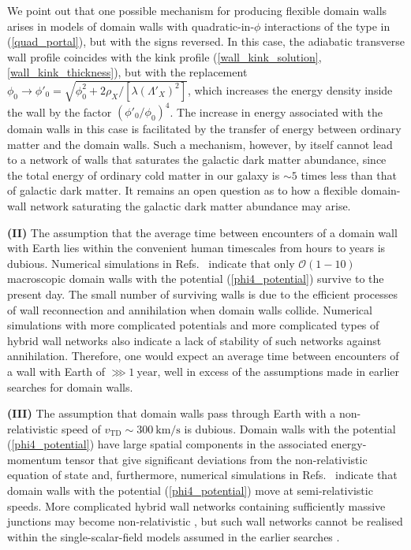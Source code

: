 \documentclass[aps,prd,onecolumn,nofootinbib]{revtex4-2} %
\begin{document}
We point out that one possible mechanism for producing flexible domain walls arises in models of domain walls with quadratic-in-$\phi$ interactions of the type in (\ref{quad_portal}), but with the signs reversed. 
In this case, the adiabatic transverse wall profile coincides with the kink profile (\ref{wall_kink_solution},\ref{wall_kink_thickness}), but with the replacement $\phi_0 \to \phi'_0 = \sqrt{\phi_0^2 + 2 \rho_X / [\lambda ( \Lambda'_X )^2]}$, which increases the energy density inside the wall by the factor $(\phi'_0/\phi_0)^4$. 
The increase in energy associated with the domain walls in this case is facilitated by the transfer of energy between ordinary matter and the domain walls. 
Such a mechanism, however, by itself cannot lead to a network of walls that saturates the galactic dark matter abundance, since the total energy of ordinary cold matter in our galaxy is $\sim 5$ times less than that of galactic dark matter. 
It remains an open question as to how a flexible domain-wall network saturating the galactic dark matter abundance may arise. 


\textbf{(II)} The assumption that the average time between encounters of a domain wall with Earth lies within the convenient human timescales from hours to years is dubious. 
Numerical simulations in Refs.~\cite{Spergel_1989_walls,Hindmarsh2003walls,Avelino2004walls,Avelino2005walls} indicate that only $\mathcal{O}(1 - 10)$ macroscopic domain walls with the potential (\ref{phi4_potential}) survive to the present day. 
The small number of surviving walls is due to the efficient processes of wall reconnection and annihilation when domain walls collide. 
Numerical simulations with more complicated potentials and more complicated types of hybrid wall networks \cite{Avelino2006walls,Avelino2010walls} also indicate a lack of stability of such networks against annihilation. 
Therefore, one would expect an average time between encounters of a wall with Earth of $\ggg 1~\textrm{year}$, well in excess of the assumptions made in earlier searches for domain walls. 


\textbf{(III)} The assumption that domain walls pass through Earth with a non-relativistic speed of $v_\textrm{TD} \sim 300~\textrm{km/s}$ is dubious. 
Domain walls with the potential (\ref{phi4_potential}) have large spatial components in the associated energy-momentum tensor that give significant deviations from the non-relativistic equation of state and, furthermore, numerical simulations in Refs.~\cite{Spergel_1989_walls,Avelino2004walls,Avelino2005walls-semirelativistic} indicate that domain walls with the potential (\ref{phi4_potential}) move at semi-relativistic speeds. 
More complicated hybrid wall networks containing sufficiently massive junctions may become non-relativistic \cite{Avelino2006walls,Avelino2010walls}, but such wall networks cannot be realised within the single-scalar-field models assumed in the earlier searches \cite{Wcislo_2016_TDM-cavity,Roberts_2017_TDM-GPS,Wcislo_2018_TDM-cavity,Roberts_2019_TDM-clocks,Pustelny_GNOME_2013}. 
\end{document}
